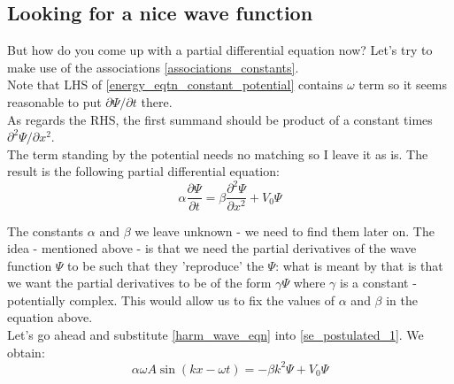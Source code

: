 \documentclass[12pt]{article}
\begin{document}
\subsection{Looking for a nice wave function}
But how do you come up with a partial differential equation now?
Let's try to make use of the associations \eqref{associations_constants}.
\\ \indent Note that LHS of \eqref{energy_eqtn_constant_potential}
contains $\omega$ term so it seems reasonable to put 
$\partial \Psi / \partial t$ there. 
\\ \indent As regards the RHS, the first summand 
should be product of a constant times $\partial^2 \Psi / \partial x^2$. 
\\ \indent The term standing by the potential needs no matching so I leave it as is. The result is 
the following partial differential equation:
\begin{equation}
\label{se_postulated_1}
\alpha \frac{\partial \Psi}{\partial t} = 
\beta \frac{\partial^2 \Psi}{\partial x^2} + V_0 \Psi
\end{equation}


The constants $\alpha$ and $\beta$ we leave unknown - we need to find them later on.
The idea - mentioned above - is that we need the partial derivatives 
of the wave function $\Psi$ to be such 
that they 'reproduce' the $\Psi$: what is meant by that is that we want the partial 
derivatives to be of the form  $\gamma \Psi$ where $\gamma$ is a constant - 
potentially complex. This would allow us to fix the values of $\alpha$ and 
$\beta$ in the equation above.
\\ \indent Let's go ahead and substitute \eqref{harm_wave_eqn} into \eqref{se_postulated_1}. We obtain:
\begin{equation}
\label{almost_there_equation}
\alpha \omega A \sin(kx - \omega t) = - \beta k^2 \Psi + V_0 \Psi
\end{equation}
\end{document}
